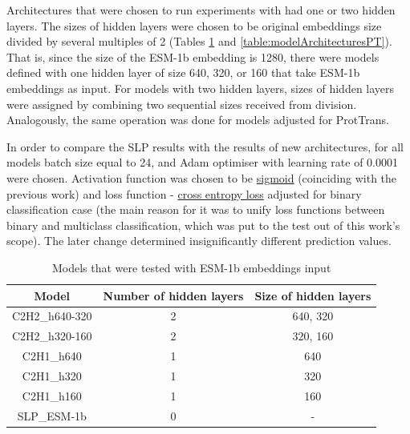 \documentclass[12pt]{article}
\begin{document}
	Architectures that were chosen to run experiments with 
	had one or two hidden layers. The sizes of hidden layers 
	were chosen to be original embeddings size divided 
	by several multiples of 2 (Tables \ref{table:modelArchitecturesESM} 
	and \ref{table:modelArchitecturesPT}). That is, since the 
	size of the ESM-1b embedding is 1280, there were 
	models defined with one hidden layer of size 640, 320, or 160 
	that take ESM-1b embeddings as input. For models with two 
	hidden layers, sizes of hidden layers were assigned by 
	combining two sequential sizes received from division. 
	Analogously, the same operation was done for models adjusted 
	for ProtTrans.

	In order to compare the SLP results with the results of new 
	architectures, for all models 
	batch size equal to 24, and Adam optimiser \cite{kingma2014adam} 
	with learning rate of 0.0001 were chosen. Activation function was 
	chosen to be \href{https://pytorch.org/docs/stable/generated/torch.nn.Sigmoid.html}{sigmoid}
	(coinciding with the previous work) and loss function - 
	\href{https://pytorch.org/docs/stable/generated/torch.nn.CrossEntropyLoss.html}{cross entropy loss}
	adjusted for binary classification case (the main reason for it was to unify loss functions between 
	binary and multiclass classification, which was put to the test out of this work's scope). 
	The later change determined  insignificantly different prediction values.

	\begin{table}[h!]
		\caption{Models that were tested with ESM-1b embeddings input}
		\vspace{0.2cm}
		\centering
		\begin{tabular}{ | c | c c | }
			\hline 
			Model & Number of hidden layers & Size of hidden layers \\
			\hline 
			C2H2\_h640-320 & 2 & 640, 320 \\
			C2H2\_h320-160 & 2 & 320, 160 \\
			C2H1\_h640 & 1 & 640 \\
			C2H1\_h320 & 1 & 320 \\
			C2H1\_h160 & 1 & 160 \\
			SLP\_ESM-1b & 0 & - \\
			\hline    
		\end{tabular}
		\label{table:modelArchitecturesESM}
	\end{table}
\end{document}
